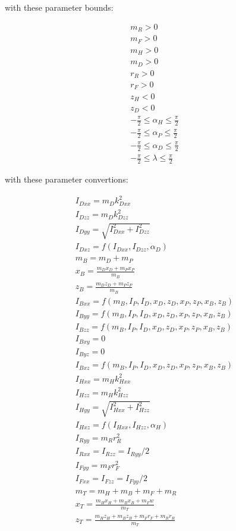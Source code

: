 \documentclass{icsc}
\begin{document}
with these parameter bounds:

\begin{align}
  m_R > 0 \\
  m_F > 0 \\
  m_H > 0 \\
  m_D > 0 \\
  r_R > 0 \\
  r_F > 0 \\
  z_H < 0 \\
  z_D < 0 \\
  -\frac{\pi}{2} \leq \alpha_H \leq \frac{\pi}{2} \\
  -\frac{\pi}{2} \leq \alpha_P \leq \frac{\pi}{2} \\
  -\frac{\pi}{2} \leq \alpha_D \leq \frac{\pi}{2} \\
  -\frac{\pi}{2} \leq \lambda \leq \frac{\pi}{2}
\end{align}

with these parameter convertions:

\begin{align}
  I_{Dxx} = m_D k_{Dxx}^2 \\
  I_{Dzz} = m_D k_{Dzz}^2 \\
  I_{Dyy} = \sqrt{I_{Dxx}^2 + I_{Dzz}^2} \\
  I_{Dxz} = f(I_{Dxx}, I_{Dzz}, \alpha_D)  \\
  m_B = m_D + m_P \\
  x_B = \frac{m_D x_D + m_P x_P}{m_B} \\
  z_B = \frac{m_D z_D + m_P z_P}{m_B} \\
  I_{Bxx} = f(m_B, I_P, I_D, x_D, z_D, x_P, z_P, x_B, z_B) \\
  I_{Byy} = f(m_B, I_P, I_D, x_D, z_D, x_P, z_P, x_B, z_B) \\
  I_{Bzz} = f(m_B, I_P, I_D, x_D, z_D, x_P, z_P, x_B, z_B) \\
  I_{Bxy} = 0 \\
  I_{Byz} = 0 \\
  I_{Bxz} = f(m_B, I_P, I_D, x_D, z_D, x_P, z_P, x_B, z_B) \\
  I_{Hxx} = m_H k_{Hxx}^2 \\
  I_{Hzz} = m_H k_{Hzz}^2 \\
  I_{Hyy} = \sqrt{I_{Hxx}^2 + I_{Hzz}^2} \\
  I_{Hxz} = f(I_{Hxx}, I_{Hzz}, \alpha_H)  \\
  I_{Ryy} = m_R r_R^2 \\
  I_{Rxx} = I_{Rzz} = I_{Ryy} / 2 \\
  I_{Fyy} = m_F r_F^2 \\
  I_{Fxx} = I_{Fzz} = I_{Fyy} / 2 \\
  m_T = m_H + m_B + m_F + m_R \\
  x_T = \frac{m_H x_H + m_B x_B + m_F w}{m_T} \\
  z_T = \frac{m_H z_H + m_B z_B + m_F r_F + m_R r_R}{m_T} 
\end{align}
\end{document}
